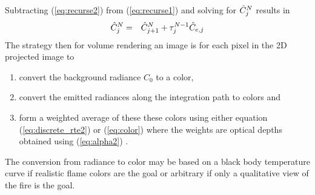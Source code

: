 Subtracting (\ref{eq:recurse2}) from (\ref{eq:recurse1}) and solving for $\hat{C}_{j}^N$ results in
\begin{eqnarray}
\label{eq:color}
\hat{C}_{j}^N&=&\hat{C}_{j+1}^N+\tau_{j}^{N-1}\hat{C}_{e,j}
\end{eqnarray}
The strategy then for volume rendering an image is for each pixel in the 2D projected image to
\begin{enumerate}
\item convert the background radiance $C_0$ to a color,
\item convert the emitted radiances along the integration path to colors and
\item form a weighted average of these these colors using either equation (\ref{eq:discrete_rte2}) or (\ref{eq:color}) where the weights are optical depths obtained using (\ref{eq:alpha2}) .
\end{enumerate}
The conversion from radiance to color may be based on a black body temperature curve if realistic flame colors are the goal or arbitrary if only a qualitative view of the fire is the goal.
